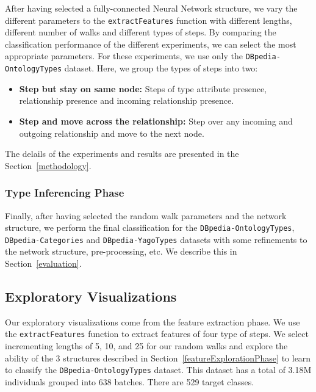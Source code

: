 \documentclass[runningheads,a4paper]{IEEEtran}
\begin{document}
After having selected a fully-connected Neural Network structure, we vary the different parameters to the \texttt{extractFeatures} function with different lengths, different number of walks and different types of steps. By comparing the classification performance of the different experiments, we can select the most appropriate parameters. For these experiments, we use only the \texttt{DBpedia-OntologyTypes} dataset. Here, we group the types of steps into two:
  \begin{itemize}
     \item \textbf{Step but stay on same node:} Steps of type attribute presence, relationship presence and incoming relationship presence.
     \item \textbf{Step and move across the relationship:} Step over any incoming and outgoing relationship and move to the next node. 
  \end{itemize}  
The delails of the experiments and results are presented in the Section~\ref{methodology}.

\subsubsection{Type Inferencing Phase} 
Finally, after having selected the random walk parameters and the network structure, we perform the final classification for the \texttt{DBpedia-OntologyTypes}, \texttt{DBpedia-Categories} and \texttt{DBpedia-YagoTypes} datasets with some refinements to the network structure, pre-processing, etc. We describe this in Section~\ref{evaluation}.

\subsection{Exploratory Visualizations}
\label{phase1}
Our exploratory visualizations come from the feature extraction phase. We use the \texttt{extractFeatures} function to extract features of four type of steps. We select incrementing lengths of 5, 10, and 25 for our random walks and explore the ability of the 3 structures described in Section~\ref{featureExplorationPhase} to learn to classify the \texttt{DBpedia-OntologyTypes} dataset. This dataset has a total of 3.18M individuals grouped into 638 batches. There are 529 target classes.
\end{document}
